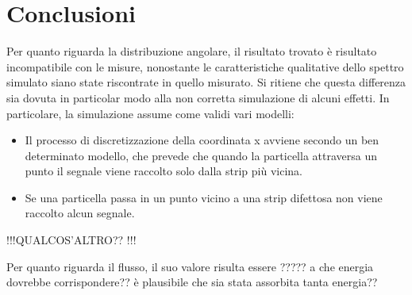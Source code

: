 \documentclass[8pt]{extarticle}
\begin{document}
\section{Conclusioni}
Per quanto riguarda la distribuzione angolare, il risultato trovato è risultato incompatibile con le misure, nonostante le caratteristiche qualitative dello spettro simulato siano state riscontrate in quello misurato. Si ritiene che questa differenza sia dovuta in particolar modo alla non corretta simulazione di alcuni effetti. In particolare, la simulazione assume come validi vari modelli: \\
\begin{itemize}
\item Il processo di discretizzazione della coordinata x avviene secondo un ben determinato modello, che prevede che quando la particella attraversa un punto il segnale viene raccolto solo dalla strip più vicina.
\item Se una particella passa in un punto vicino a una strip difettosa non viene raccolto alcun segnale.
\end{itemize}

!!!QUALCOS'ALTRO?? !!!

Per quanto riguarda il flusso, il suo valore risulta essere ????? a che energia dovrebbe corrispondere?? è plausibile che sia stata assorbita tanta energia??



\end{document}
